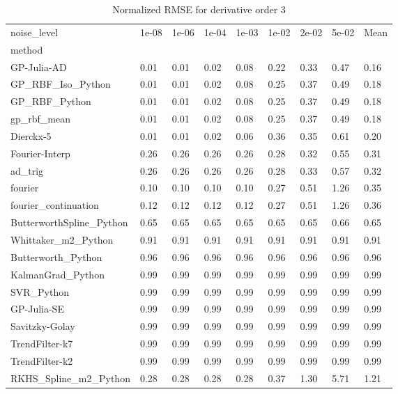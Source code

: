\begin{table}
\caption{Normalized RMSE for derivative order 3}
\label{tab:nrmse_order_3}
\begin{tabular}{lllllllll}
\toprule
noise_level & 1e-08 & 1e-06 & 1e-04 & 1e-03 & 1e-02 & 2e-02 & 5e-02 & Mean \\
method &  &  &  &  &  &  &  &  \\
\midrule
GP-Julia-AD & 0.01 & 0.01 & 0.02 & 0.08 & 0.22 & 0.33 & 0.47 & 0.16 \\
GP_RBF_Iso_Python & 0.01 & 0.01 & 0.02 & 0.08 & 0.25 & 0.37 & 0.49 & 0.18 \\
GP_RBF_Python & 0.01 & 0.01 & 0.02 & 0.08 & 0.25 & 0.37 & 0.49 & 0.18 \\
gp_rbf_mean & 0.01 & 0.01 & 0.02 & 0.08 & 0.25 & 0.37 & 0.49 & 0.18 \\
Dierckx-5 & 0.01 & 0.01 & 0.02 & 0.06 & 0.36 & 0.35 & 0.61 & 0.20 \\
Fourier-Interp & 0.26 & 0.26 & 0.26 & 0.26 & 0.28 & 0.32 & 0.55 & 0.31 \\
ad_trig & 0.26 & 0.26 & 0.26 & 0.26 & 0.28 & 0.33 & 0.57 & 0.32 \\
fourier & 0.10 & 0.10 & 0.10 & 0.10 & 0.27 & 0.51 & 1.26 & 0.35 \\
fourier_continuation & 0.12 & 0.12 & 0.12 & 0.12 & 0.27 & 0.51 & 1.26 & 0.36 \\
ButterworthSpline_Python & 0.65 & 0.65 & 0.65 & 0.65 & 0.65 & 0.65 & 0.66 & 0.65 \\
Whittaker_m2_Python & 0.91 & 0.91 & 0.91 & 0.91 & 0.91 & 0.91 & 0.91 & 0.91 \\
Butterworth_Python & 0.96 & 0.96 & 0.96 & 0.96 & 0.96 & 0.96 & 0.96 & 0.96 \\
KalmanGrad_Python & 0.99 & 0.99 & 0.99 & 0.99 & 0.99 & 0.99 & 0.99 & 0.99 \\
SVR_Python & 0.99 & 0.99 & 0.99 & 0.99 & 0.99 & 0.99 & 0.99 & 0.99 \\
GP-Julia-SE & 0.99 & 0.99 & 0.99 & 0.99 & 0.99 & 0.99 & 0.99 & 0.99 \\
Savitzky-Golay & 0.99 & 0.99 & 0.99 & 0.99 & 0.99 & 0.99 & 0.99 & 0.99 \\
TrendFilter-k7 & 0.99 & 0.99 & 0.99 & 0.99 & 0.99 & 0.99 & 0.99 & 0.99 \\
TrendFilter-k2 & 0.99 & 0.99 & 0.99 & 0.99 & 0.99 & 0.99 & 0.99 & 0.99 \\
RKHS_Spline_m2_Python & 0.28 & 0.28 & 0.28 & 0.28 & 0.37 & 1.30 & 5.71 & 1.21 \\

\end{tabular}
\end{table}
